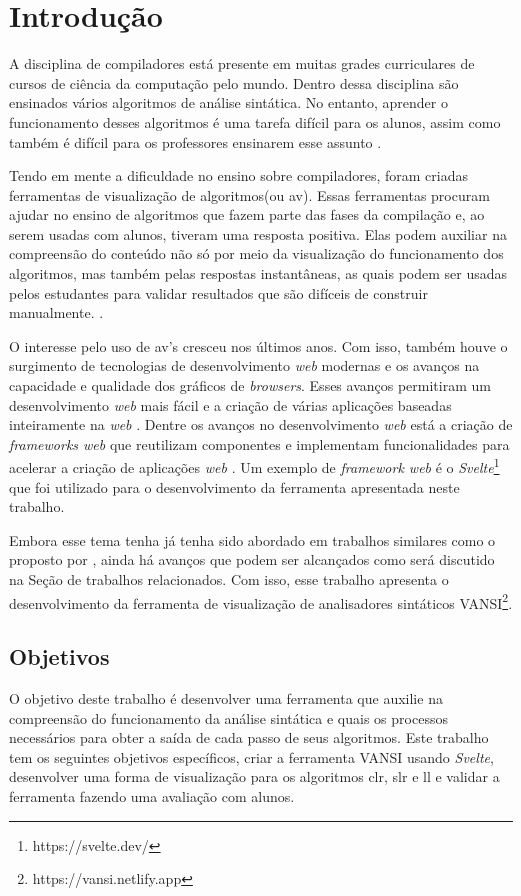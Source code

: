 
\chapter{Introdução}
\label{cap:introducao}

A disciplina de compiladores está presente em muitas grades curriculares de cursos de ciência da computação pelo mundo. Dentro dessa disciplina são ensinados vários algoritmos de análise sintática. No entanto, aprender o funcionamento desses algoritmos é uma tarefa difícil para os alunos, assim como também é difícil para os professores ensinarem esse assunto \cite{sangal2018pavt}.

Tendo em mente a dificuldade no ensino sobre compiladores, foram criadas ferramentas de visualização de algoritmos(ou \gls{av}). Essas ferramentas procuram ajudar no ensino de algoritmos que fazem parte das fases da compilação e, ao serem usadas com alunos, tiveram uma resposta positiva. Elas podem auxiliar na compreensão do conteúdo não só por meio da visualização do funcionamento dos algoritmos, mas também pelas respostas instantâneas, as quais podem ser usadas pelos estudantes para validar resultados que são difíceis de construir manualmente. \cite{10.1145/3002136}.

O interesse pelo uso de \gls{av}'s cresceu nos últimos anos. Com isso, também houve o surgimento de tecnologias de desenvolvimento \textit{web} modernas e os avanços na capacidade e qualidade dos gráficos de \textit{browsers}. Esses avanços permitiram um desenvolvimento \textit{web} mais fácil e a criação de várias aplicações baseadas inteiramente na \textit{web} \cite{effectiveav}. Dentre os avanços no desenvolvimento \textit{web} está a criação de \textit{frameworks web} que reutilizam componentes e implementam funcionalidades para acelerar a criação de aplicações \textit{web} \cite{uppal2022}. Um exemplo de \textit{framework web} é o \textit{Svelte}\footnote{https://svelte.dev/} que foi utilizado para o desenvolvimento da ferramenta apresentada neste trabalho.

Embora esse tema tenha já tenha sido abordado em trabalhos similares como o proposto por \textcite{pavt}, ainda há avanços que podem ser alcançados como será discutido na Seção de trabalhos relacionados. Com isso, esse trabalho apresenta o desenvolvimento da ferramenta de visualização de analisadores sintáticos VANSI\footnote{https://vansi.netlify.app}.

\section{Objetivos}
O objetivo deste trabalho é desenvolver uma ferramenta que auxilie na compreensão do funcionamento da análise sintática e quais os processos necessários para obter a saída de cada passo de seus algoritmos. Este trabalho tem os seguintes objetivos específicos,
criar a ferramenta VANSI usando \textit{Svelte}, desenvolver uma forma de visualização para os algoritmos \gls{clr}, \gls{slr} e \gls{ll} e validar a ferramenta fazendo uma avaliação com alunos.

